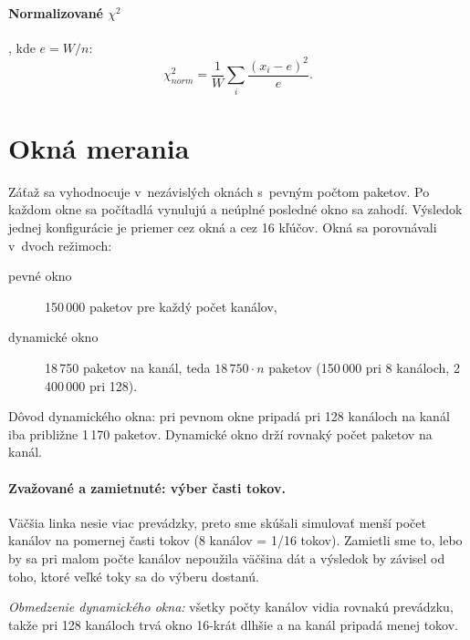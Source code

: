 \paragraph{Normalizované $\chi^2$}, kde $e = W/n$:
\begin{equation}
  \chi^2_\mathit{norm} = \frac{1}{W} \sum_i \frac{(x_i - e)^2}{e} .
\end{equation}

\section{Okná merania}
\label{sec:okna}

Záťaž sa vyhodnocuje v~nezávislých oknách s~pevným počtom paketov. Po každom okne sa
počítadlá vynulujú a neúplné posledné okno sa zahodí. Výsledok jednej konfigurácie je priemer
cez okná a cez 16 kľúčov. Okná sa porovnávali v~dvoch režimoch:

\begin{description}
  \item[pevné okno] 150\,000 paketov pre každý počet kanálov,
  \item[dynamické okno] 18\,750 paketov na kanál, teda $18\,750 \cdot n$ paketov
        (150\,000 pri 8 kanáloch, 2\,400\,000 pri 128).
\end{description}

Dôvod dynamického okna: pri pevnom okne pripadá pri 128 kanáloch na kanál iba približne
1\,170 paketov. Dynamické okno drží rovnaký počet paketov na kanál.

\paragraph{Zvažované a zamietnuté: výber časti tokov.}
Väčšia linka nesie viac prevádzky, preto sme skúšali simulovať menší počet kanálov na
pomernej časti tokov (8 kanálov = 1/16 tokov). Zamietli sme to, lebo by sa pri malom počte
kanálov nepoužila väčšina dát a výsledok by závisel od toho, ktoré veľké toky sa do výberu
dostanú.

\emph{Obmedzenie dynamického okna:} všetky počty kanálov vidia rovnakú prevádzku, takže
pri 128 kanáloch trvá okno 16-krát dlhšie a na kanál pripadá menej tokov.
